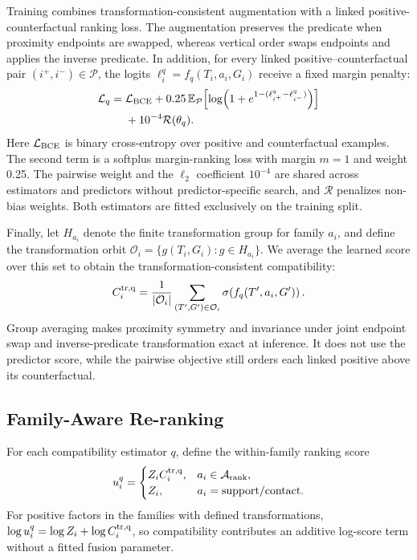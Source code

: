 \documentclass[letterpaper]{article}
\begin{document}
Training combines transformation-consistent augmentation with a linked positive-counterfactual ranking loss. The augmentation preserves the predicate when proximity endpoints are swapped, whereas vertical order swaps endpoints and applies the inverse predicate. In addition, for every linked positive--counterfactual pair $(i^+,i^-)\in\mathcal P$, the logits $\ell_i^q=f_q(T_i,a_i,G_i)$ receive a fixed margin penalty:
\begin{equation}
\begin{aligned}
\mathcal L_q={}&\mathcal L_{\rm BCE}
+0.25\,\mathbb E_{\mathcal P}\!
 \left[\log\!\left(1+e^{1-(\ell^q_{i^+}-\ell^q_{i^-})}\right)\right]\\
&+10^{-4}\mathcal R(\theta_q).
\end{aligned}
\end{equation}
Here $\mathcal L_{\rm BCE}$ is binary cross-entropy over positive and counterfactual examples. The second term is a softplus margin-ranking loss with margin $m=1$ and weight 0.25. The pairwise weight and the $\ell_2$ coefficient $10^{-4}$ are shared across estimators and predictors without predictor-specific search, and $\mathcal R$ penalizes non-bias weights.
Both estimators are fitted exclusively on the training split.

Finally, let $H_{a_i}$ denote the finite transformation group for family $a_i$, and define the transformation orbit $\mathcal O_i=\{g(T_i,G_i):g\in H_{a_i}\}$. We average the learned score over this set to obtain the transformation-consistent compatibility:
\begin{equation}
C_i^{\rm tr,q}=\frac{1}{|\mathcal O_i|}
\sum_{(T',G')\in\mathcal O_i} \sigma\!\left(f_q(T',a_i,G')\right).
\label{eq:algebra-projection}
\end{equation}
Group averaging makes proximity symmetry and invariance under joint endpoint swap and inverse-predicate transformation exact at inference. It does not use the predictor score, while the pairwise objective still orders each linked positive above its counterfactual.

\subsection{Family-Aware Re-ranking}
For each compatibility estimator $q$, define the within-family ranking score
\begin{equation}
u_i^q=\begin{cases}
Z_iC_i^{\rm tr,q}, & a_i\in\mathcal A_{\rm rank},\\
Z_i, & a_i=\mathrm{support/contact}.
\end{cases}
\end{equation}
For positive factors in the families with defined transformations, $\log u_i^q=\log Z_i+\log C_i^{\rm tr,q}$, so compatibility contributes an additive log-score term without a fitted fusion parameter.
\end{document}
